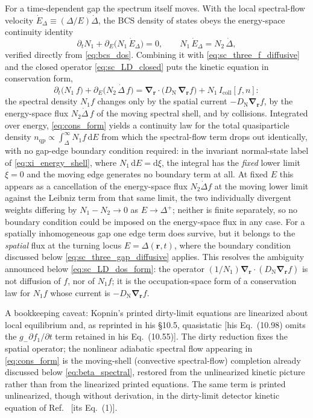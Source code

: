 \documentclass[
  aps,
  prb,
  preprint,
  superscriptaddress,
  longbibliography,
  nofootinbib
]{revtex4-2}
\newcommand{\dd}{\mathrm{d}}
\newcommand{\br}{\mathbf{r}}
\newcommand{\bnabla}{\boldsymbol{\nabla}}
\newcommand{\DOS}{N_1}
\newcommand{\DN}{D_{\mathrm{N}}}
\newcommand{\Icoll}{I_{\mathrm{coll}}}
\newcommand{\qp}{\mathrm{qp}}
\begin{document}
For a time-dependent gap the spectrum itself moves. With the local
spectral-flow velocity \(\dot E_\Delta\equiv(\Delta/E)\dot\Delta\), the
BCS density of states obeys the energy-space continuity identity
\begin{equation}
  \partial_t\DOS
  +
  \partial_E\bigl(\DOS\,\dot E_\Delta\bigr)
  =
  0,
  \qquad
  \DOS\,\dot E_\Delta=N_2\,\dot\Delta,
  \label{eq:cons_dos_continuity}
\end{equation}
verified directly from \cref{eq:bcs_dos}. Combining it with
\cref{eq:sc_three_f_diffusive} and the closed operator
\cref{eq:sc_LD_closed} puts the kinetic equation in
conservation form,
\begin{equation}
  \partial_t\bigl(\DOS\,f\bigr)
  +
  \partial_E\bigl(N_2\,\dot\Delta\,f\bigr)
  =
  \bnabla_{\br}\cdot\bigl(\DN\,\bnabla_{\br}f\bigr)
  +
  \DOS\,\Icoll[f,n]:
  \label{eq:cons_form}
\end{equation}
the spectral density \(\DOS f\) changes only by the spatial current
\(-\DN\bnabla_{\br}f\), by the energy-space flux \(N_2\dot\Delta\,f\)
of the moving spectral shell, and by collisions. Integrated over
energy, \cref{eq:cons_form} yields a continuity law for the total
quasiparticle density \(n_{\qp}\propto\int_\Delta^\infty\DOS f\,\dd E\) from
which the spectral-flow term drops out identically, with no gap-edge
boundary condition required: in the invariant normal-state label of
\cref{eq:xi_energy_shell}, where \(\DOS\,\dd E=\dd\xi\), the integral has
the \emph{fixed} lower limit \(\xi=0\) and the moving edge generates no
boundary term at all. At fixed \(E\) this appears as a cancellation of the
energy-space flux \(N_2\dot\Delta f\) at the moving lower limit against the
Leibniz term from that same limit, the two individually divergent weights
differing by \(\DOS-N_2\to0\) as \(E\to\Delta^{+}\); neither is finite
separately, so no boundary condition could be imposed on the energy-space
flux in any case. For a spatially inhomogeneous gap one edge term does
survive, but it belongs to the \emph{spatial} flux at the turning locus
\(E=\Delta(\br,t)\), where the boundary condition discussed below
\cref{eq:sc_three_gap_diffusive} applies. This resolves
the ambiguity announced below \cref{eq:sc_LD_dos_form}: the operator
\((1/\DOS)\bnabla_{\br}\cdot(\DN\bnabla_{\br}f)\) is not diffusion of
\(f\), nor of \(\DOS f\); it is the occupation-space form of a
conservation law for \(\DOS f\) whose current is
\(-\DN\bnabla_{\br}f\).

A bookkeeping caveat: Kopnin's printed dirty-limit equations are
linearized about local equilibrium and, as reprinted in his \S10.5,
quasistatic [his Eq.~(10.98) omits the \(g_-\partial f_1/\partial t\)
term retained in his Eq.~(10.55)]. The dirty reduction fixes the
spatial operator; the nonlinear adiabatic spectral flow appearing in
\cref{eq:cons_form} is the moving-shell (convective spectral-flow)
completion already discussed below \cref{eq:beta_spectral}, restored from the unlinearized kinetic
picture rather than from the linearized printed equations. The same term
is printed unlinearized, though without derivation, in the dirty-limit
detector kinetic equation of Ref.~ [its
Eq.~(1)].
\end{document}
